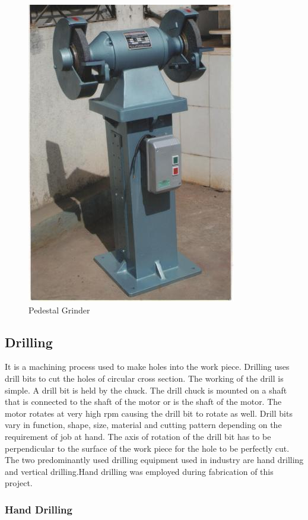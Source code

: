 \begin{figure}[H]
    \centering
    \includegraphics[scale=0.3]{Grinder.jpg}
    \caption{Pedestal Grinder}
    \label{fig:Pedestal Grinder}
\end{figure}


\subsection{Drilling} \label{Drilling}

It is a machining process used to make holes into the work piece. Drilling uses drill bits to cut the holes of circular cross section. The working of the drill is simple. A drill bit is held by the chuck. The drill chuck is mounted on a shaft that is connected to the shaft of the motor or is the shaft of the motor. The motor rotates at very high rpm causing the drill bit to rotate as well. Drill bits vary in function, shape, size, material and cutting pattern depending on the requirement of job at hand. The axis of rotation of the drill bit has to be perpendicular to the surface of the work piece for the hole to be perfectly cut. The two predominantly used drilling equipment used in industry are hand drilling and vertical drilling.Hand drilling was employed during fabrication of this project.

\subsubsection{Hand Drilling} \label{Hand Drilling}

